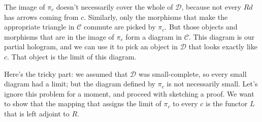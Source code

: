 \documentclass[11pt]{amsart}
\newcommand{\cat}[1]{\mathcal{#1}}
\begin{document}
\begin{figure}[H]
\end{figure}

The image of $\pi_c$ doesn't necessarily cover the whole of $\cat D$, because not every $R d$ has arrows coming from $c$. Similarly, only the morphisms that make the appropriate triangle in $\cat C$ commute are picked by $\pi_c$. But those objects and morphisms that are in the image of $\pi_c$ form a diagram in $\cat C$. This diagram is our partial hologram, and we can use it to pick an object in $\cat D$ that looks exactly like $c$. That object is the limit of this diagram. 

Here's the tricky part: we assumed that $\cat D$ was small-complete, so every small diagram had a limit; but the diagram defined by $\pi_c$ is not necessarily small. Let's ignore this problem for a moment, and proceed with sketching a proof. We want to show that the mapping that assigns the limit of $\pi_c$ to every $c$ is the functor $L$ that is left adjoint to $R$. 
\end{document}
